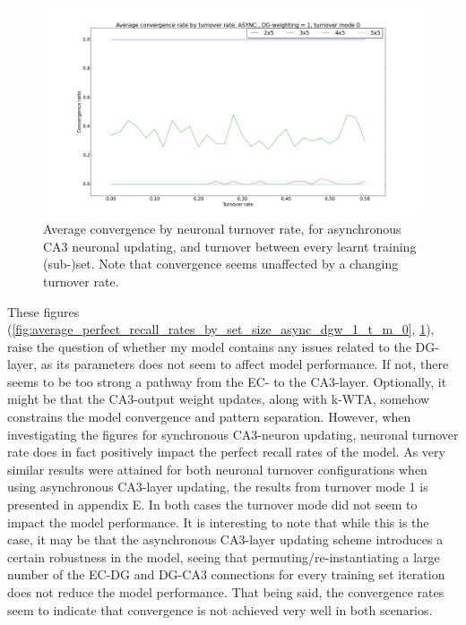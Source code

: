 \begin{figure}
    \centering
    \includegraphics[width=14cm]{fig/avg_convergence_by_turnover_rate_async_dgw_1_t_m_0_no_err_bars}
    \caption{Average convergence by neuronal turnover rate, for asynchronous CA3 neuronal updating, and turnover between every learnt training (sub-)set. Note that convergence seems unaffected by a changing turnover rate.}
    \label{fig:avg_convergence_by_turnover_rate_async_dgw_1_t_m_0_no_err_bars}
\end{figure}

These figures (\ref{fig:average_perfect_recall_rates_by_set_size_async_dgw_1_t_m_0}, \ref{fig:avg_convergence_by_turnover_rate_async_dgw_1_t_m_0_no_err_bars}), raise the question of whether my model contains any issues related to the DG-layer, as its parameters does not seem to affect model performance. If not, there seems to be too strong a pathway from the EC- to the CA3-layer. Optionally, it might be that the CA3-output weight updates, along with k-WTA, somehow constrains the model convergence and pattern separation. However, when investigating the figures for synchronous CA3-neuron updating, neuronal turnover rate does in fact positively impact the perfect recall rates of the model. As very similar results were attained for both neuronal turnover configurations when using asynchronous CA3-layer updating, the results from turnover mode 1 is presented in appendix E. 
In both cases the turnover mode did not seem to impact the model performance. It is interesting to note that while this is the case, it may be that the asynchronous CA3-layer updating scheme introduces a certain robustness in the model, seeing that permuting/re-instantiating a large number of the EC-DG and DG-CA3 connections for every training set iteration does not reduce the model performance. That being said, the convergence rates seem to indicate that convergence is not achieved very well in both scenarios.

